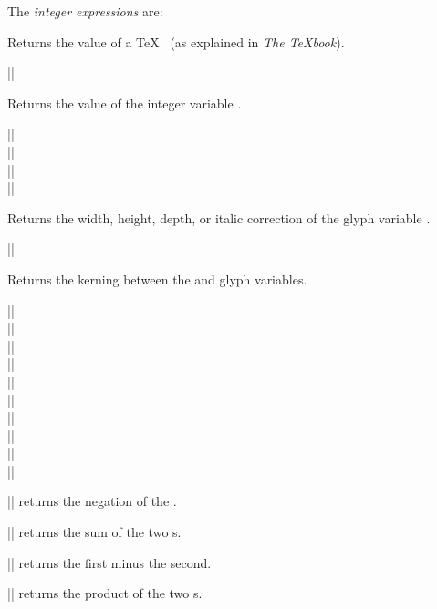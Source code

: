 \documentclass[a4paper]{ltxguide}
\begin{document}
The \emph{integer expressions} are:

\begin{decl}
\end{decl}
Returns the value of a \TeX\  (as explained in \emph{The \TeX book}).

\begin{decl}
  |\int|
\end{decl}
Returns the value of the integer variable .

\begin{decl}
  |\width|\\
  |\height|\\
  |\depth|\\
  |\italic|
\end{decl}
Returns the width, height, depth, or italic correction of the glyph
variable .

\begin{decl}
  ||
\end{decl}
Returns the kerning between the  and  glyph
variables.

\begin{decl}
  |\neg|\\
  |\add|\\
  |\sub|\\
  |\max|\\
  |\min|\\
  |\mul|\\
  |\div|\\
  |\scale|\\
  |\half|\\
  |\otherhalf|
\end{decl}
|\neg| returns the negation of the .

|\ad| returns the sum of the two s.

|\sub| returns the first  minus the second.

|\mul| returns the product of the two s.
\end{document}
